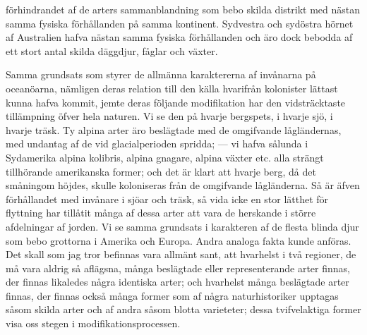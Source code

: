 förhindrandet af de arters sammanblandning som bebo skilda distrikt med nästan samma fysiska förhållanden på samma kontinent. Sydvestra och sydöstra hörnet af Australien hafva nästan samma fysiska förhållanden och äro dock bebodda af ett stort antal skilda däggdjur, fåglar och växter.

Samma grundsats som styrer de allmänna karaktererna af invånarna på oceanöarna, nämligen deras relation till den källa hvarifrån kolonister lättast kunna hafva kommit, jemte deras följande modifikation har den vidsträcktaste tillämpning öfver hela naturen. Vi se den på hvarje bergspets, i hvarje sjö, i hvarje träsk. Ty alpina arter äro beslägtade med de omgifvande lågländernas, med undantag af de vid glacialperioden spridda; — vi hafva sålunda i Sydamerika alpina kolibris, alpina gnagare, alpina växter etc. alla strängt tillhörande amerikanska former; och det är klart att hvarje berg, då det småningom höjdes, skulle koloniseras från de omgifvande lågländerna. Så är äfven förhållandet med invånare i sjöar och träsk, så vida icke en stor lätthet för flyttning har tillåtit många af dessa arter att vara de herskande i större afdelningar af jorden. Vi se samma grundsats i karakteren af de flesta blinda djur som bebo grottorna i Amerika och Europa. Andra analoga fakta kunde anföras. Det skall som jag tror befinnas vara allmänt sant, att hvarhelst i två regioner, de må vara aldrig så aflägsna, många beslägtade eller representerande arter finnas, der finnas likaledes några identiska arter; och hvarhelst många beslägtade arter finnas, der finnas också många former som af några naturhistoriker upptagas såsom skilda arter och af andra såsom blotta varieteter; dessa tvifvelaktiga former visa oss stegen i modifikationsprocessen.

